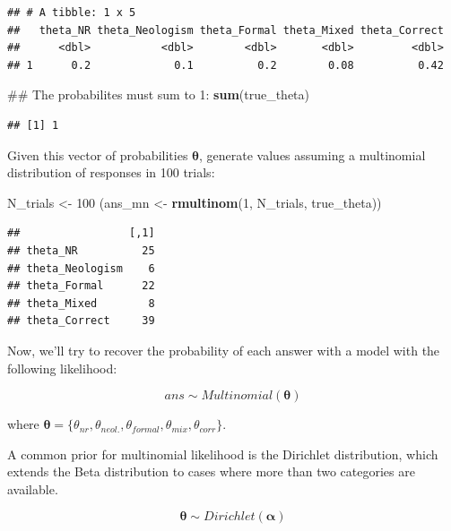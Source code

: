 \documentclass[12pt,]{krantz}
\newenvironment{Shaded}{\begin{snugshade}}{\end{snugshade}}
\newcommand{\KeywordTok}[1]{\textcolor[rgb]{0.13,0.29,0.53}{\textbf{#1}}}
\newcommand{\DecValTok}[1]{\textcolor[rgb]{0.00,0.00,0.81}{#1}}
\newcommand{\StringTok}[1]{\textcolor[rgb]{0.31,0.60,0.02}{#1}}
\newcommand{\NormalTok}[1]{#1}
\theoremstyle{definition}
\theoremstyle{definition}
\theoremstyle{definition}
\theoremstyle{remark}
\begin{document}
\begin{verbatim}
## # A tibble: 1 x 5
##   theta_NR theta_Neologism theta_Formal theta_Mixed theta_Correct
##      <dbl>           <dbl>        <dbl>       <dbl>         <dbl>
## 1      0.2             0.1          0.2        0.08          0.42
\end{verbatim}

\begin{Shaded}
\begin{Highlighting}[]
\NormalTok{## The probabilites must sum to 1:}
\KeywordTok{sum}\NormalTok{(true_theta)}
\end{Highlighting}
\end{Shaded}

\begin{verbatim}
## [1] 1
\end{verbatim}

Given this vector of probabilities \(\boldsymbol{\theta}\), generate
values assuming a multinomial distribution of responses in 100 trials:

\begin{Shaded}
\begin{Highlighting}[]
\NormalTok{N_trials <-}\StringTok{ }\DecValTok{100}
\NormalTok{(ans_mn <-}\StringTok{ }\KeywordTok{rmultinom}\NormalTok{(}\DecValTok{1}\NormalTok{, N_trials, true_theta))}
\end{Highlighting}
\end{Shaded}

\begin{verbatim}
##                 [,1]
## theta_NR          25
## theta_Neologism    6
## theta_Formal      22
## theta_Mixed        8
## theta_Correct     39
\end{verbatim}

Now, we'll try to recover the probability of each answer with a model
with the following likelihood:

\begin{equation}
ans \sim Multinomial(\boldsymbol{\theta})
\end{equation}

where
\(\boldsymbol{\theta} = \{\theta_{nr}, \theta_{neol.}, \theta_{formal}, \theta_{mix}, \theta_{corr}\}\).

A common prior for multinomial likelihood is the Dirichlet distribution,
which extends the Beta distribution to cases where more than two
categories are available.

\begin{equation}
\boldsymbol{\theta} \sim Dirichlet(\boldsymbol{\alpha})
\end{equation}
\end{document}
